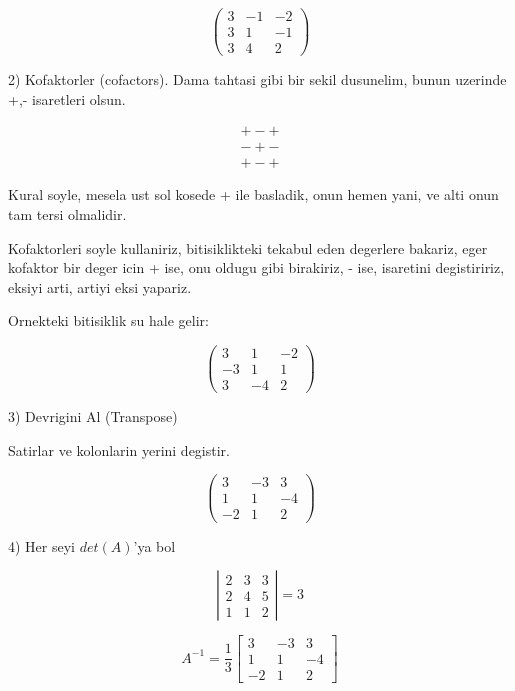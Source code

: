 \documentclass[12pt,fleqn]{article}
\begin{document}
\[ 
\left(\begin{array}{rrr}
3 & -1 & -2 \\
3 & 1 & -1 \\
3 & 4 & 2
\end{array}\right)
 \]

2) Kofaktorler (cofactors). Dama tahtasi gibi bir sekil dusunelim, bunun
uzerinde +,- isaretleri olsun. 

\[ 
\begin{array}{rr}
+ - + \\
- + - \\
+ - + 
\end{array}
 \]

Kural soyle, mesela ust sol kosede + ile basladik, onun hemen yani, ve alti
onun tam tersi olmalidir. 

Kofaktorleri soyle kullaniriz, bitisiklikteki tekabul eden degerlere
bakariz, eger kofaktor bir deger icin + ise, onu oldugu gibi birakiriz, -
ise, isaretini degistiririz, eksiyi arti, artiyi eksi yapariz. 

Ornekteki bitisiklik su hale gelir:

\[ 
\left(\begin{array}{rrr}
3 & 1 & -2 \\
-3 & 1 & 1 \\
3 & -4 & 2
\end{array}\right)
 \]

3) Devrigini Al (Transpose)

Satirlar ve kolonlarin yerini degistir. 

\[ 
\left(\begin{array}{rrr}
3 & -3 & 3 \\
1 & 1 & -4 \\
-2 & 1 & 2
\end{array}\right)
 \]

4) Her seyi $det(A)$'ya bol

\[ 
\left|\begin{array}{rrr}
2 & 3 & 3 \\
2 & 4 & 5 \\
1 & 1 & 2
\end{array}\right| = 3
 \]


\[ A^{-1} = 
\frac{1}{3}
\left[\begin{array}{rrr}
3 & -3 & 3 \\
1 & 1 & -4 \\
-2 & 1 & 2
\end{array}\right]
 \]
\end{document}
